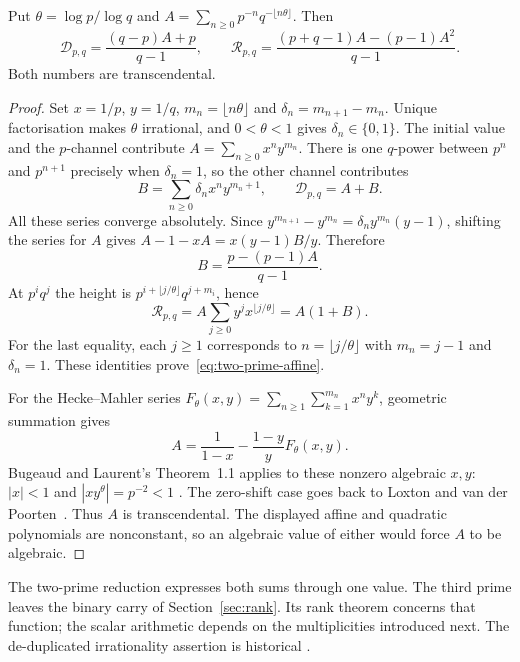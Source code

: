 \documentclass[11pt]{article}
\begin{document}
\begin{theorem}
\label{res:two-prime-transcendence}
\label{res:two-prime-repeated-transcendence}
Put $\theta=\log p/\log q$ and
$A=\sum_{n\ge0}p^{-n}q^{-\lfloor n\theta\rfloor}$.  Then
\begin{equation}\label{eq:two-prime-affine}
 \mathcal D_{p,q}=\frac{(q-p)A+p}{q-1},\qquad
 \mathcal R_{p,q}=\frac{(p+q-1)A-(p-1)A^2}{q-1}.
\end{equation}
Both numbers are transcendental.
\end{theorem}
\begin{proof}
Set $x=1/p$, $y=1/q$, $m_n=\lfloor n\theta\rfloor$ and
$\delta_n=m_{n+1}-m_n$.  Unique factorisation makes $\theta$ irrational,
and $0<\theta<1$ gives $\delta_n\in\{0,1\}$.  The initial value and the
$p$-channel contribute $A=\sum_{n\ge0}x^ny^{m_n}$.  There is one $q$-power
between $p^n$ and $p^{n+1}$ precisely when $\delta_n=1$, so the other
channel contributes
\[
 B=\sum_{n\ge0}\delta_nx^ny^{m_n+1},\qquad \mathcal D_{p,q}=A+B.
\]
All these series converge absolutely.  Since
$y^{m_{n+1}}-y^{m_n}=\delta_ny^{m_n}(y-1)$, shifting the series for $A$
gives $A-1-xA=x(y-1)B/y$.  Therefore
\[
 B=\frac{p-(p-1)A}{q-1}.
\]
At $p^iq^j$ the height is
$p^{i+\lfloor j/\theta\rfloor}q^{j+m_i}$, hence
\[
 \mathcal R_{p,q}
 =A\sum_{j\ge0}y^jx^{\lfloor j/\theta\rfloor}=A(1+B).
\]
For the last equality, each $j\ge1$ corresponds to
$n=\lfloor j/\theta\rfloor$ with $m_n=j-1$ and $\delta_n=1$.
These identities prove~\eqref{eq:two-prime-affine}.

For the Hecke--Mahler series
$F_\theta(x,y)=\sum_{n\ge1}\sum_{k=1}^{m_n}x^ny^k$, geometric summation gives
\begin{equation}\label{eq:hecke-mahler-boundary}
 A=\frac1{1-x}-\frac{1-y}{y}F_\theta(x,y).
\end{equation}
Bugeaud and Laurent's Theorem~1.1 applies to these nonzero algebraic $x,y$:
$|x|<1$ and $|xy^\theta|=p^{-2}<1$
\cite[p.~3, Theorem~1.1]{bugeaudlaurent2023}. The zero-shift case goes back
to Loxton and van der Poorten~\cite[p.~40, Theorem~8]{loxtonvdp1977}.
Thus $A$ is transcendental.
The displayed affine and quadratic polynomials are nonconstant, so an
algebraic value of either would force $A$ to be algebraic.
\end{proof}

The two-prime reduction expresses both sums through one value.  The third
prime leaves the binary carry of Section~\ref{sec:rank}.  Its rank theorem
concerns that function; the scalar arithmetic depends on the multiplicities
introduced next.  The de-duplicated irrationality assertion is historical
\cite{erdos1974letter}.
\end{document}
